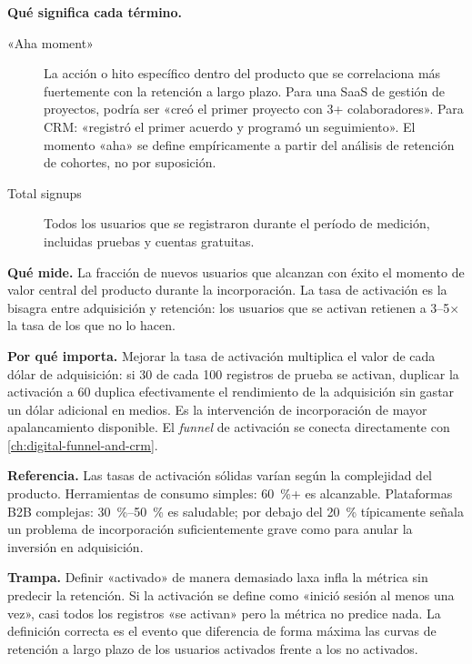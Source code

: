 \textbf{Qué significa cada término.}
\begin{description}
  \item[«Aha moment»] La acción o hito específico dentro del producto que se correlaciona
    más fuertemente con la retención a largo plazo. Para una SaaS de gestión de proyectos,
    podría ser «creó el primer proyecto con 3+ colaboradores». Para CRM: «registró el primer
    acuerdo y programó un seguimiento». El momento «aha» se define empíricamente a partir
    del análisis de retención de cohortes, no por suposición.
  \item[Total signups] Todos los usuarios que se registraron durante el período de medición,
    incluidas pruebas y cuentas gratuitas.
\end{description}

\textbf{Qué mide.} La fracción de nuevos usuarios que alcanzan con éxito el momento de valor
central del producto durante la incorporación. La tasa de activación es la bisagra entre
adquisición y retención: los usuarios que se activan retienen a 3--5$\times$ la tasa de los
que no lo hacen.

\textbf{Por qué importa.} Mejorar la tasa de activación multiplica el valor de cada dólar
de adquisición: si 30 de cada 100 registros de prueba se activan, duplicar la activación a
60 duplica efectivamente el rendimiento de la adquisición sin gastar un dólar adicional en
medios. Es la intervención de incorporación de mayor apalancamiento disponible. El \emph{funnel}
de activación se conecta directamente con \cref{ch:digital-funnel-and-crm}.

\textbf{Referencia.} Las tasas de activación sólidas varían según la complejidad del
producto. Herramientas de consumo simples: \qty{60}{\percent}+ es alcanzable. Plataformas
B2B complejas: \qty{30}{\percent}--\qty{50}{\percent} es saludable; por debajo del
\qty{20}{\percent} típicamente señala un problema de incorporación suficientemente grave como
para anular la inversión en adquisición.

\textbf{Trampa.} Definir «activado» de manera demasiado laxa infla la métrica sin predecir
la retención. Si la activación se define como «inició sesión al menos una vez», casi todos
los registros «se activan» pero la métrica no predice nada. La definición correcta es el
evento que diferencia de forma máxima las curvas de retención a largo plazo de los usuarios
activados frente a los no activados.

